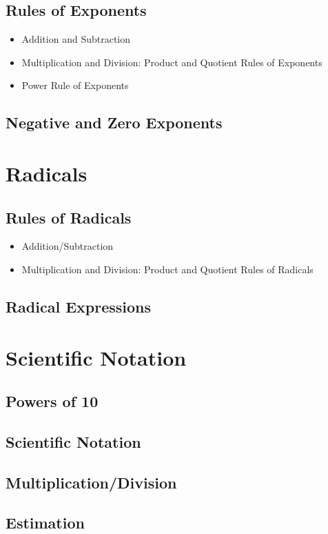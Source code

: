 \documentclass[11pt]{article}
\begin{document}
\subsection{Rules of Exponents}
\begin{itemize}
    \item Addition and Subtraction
    \item Multiplication and Division: Product and Quotient Rules of Exponents
    \item Power Rule of Exponents
\end{itemize}
\subsection{Negative and Zero Exponents}

\section{Radicals}
\subsection{Rules of Radicals}
\begin{itemize}
    \item Addition/Subtraction
    \item Multiplication and Division: Product and Quotient Rules of Radicals
\end{itemize}
\subsection{Radical Expressions}

\section{Scientific Notation}
\subsection{Powers of 10}
\subsection{Scientific Notation}
\subsection{Multiplication/Division}
\subsection{Estimation}
\end{document}
